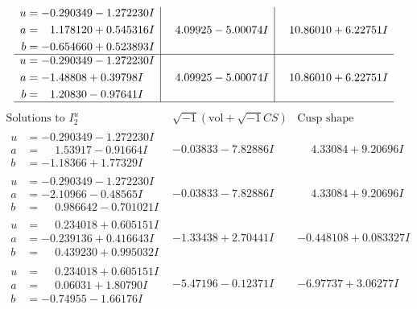 \documentclass[1p]{elsarticle_modified}
\theoremstyle{definition}
\newcommand{\I}{\sqrt{-1}}
\begin{document}
$$\begin{array}{c|c|c}
\begin{aligned}
u &= -0.290349 - 1.272230 I \\
a &= \phantom{-}1.178120 + 0.545316 I \\
b &= -0.654660 + 0.523893 I\end{aligned}
 & \phantom{-}4.09925 - 5.00074 I & \phantom{-}10.86010 + 6.22751 I \\ \hline\begin{aligned}
u &= -0.290349 - 1.272230 I \\
a &= -1.48808 + 0.39798 I \\
b &= \phantom{-}1.20830 - 0.97641 I\end{aligned}
 & \phantom{-}4.09925 - 5.00074 I & \phantom{-}10.86010 + 6.22751 I\\
 \hline 
 \end{array}$$\newpage$$\begin{array}{c|c|c}  
\text{Solutions to }I^u_{2}& \I (\text{vol} + \sqrt{-1}CS) & \text{Cusp shape}\\
 \hline 
\begin{aligned}
u &= -0.290349 - 1.272230 I \\
a &= \phantom{-}1.53917 - 0.91664 I \\
b &= -1.18366 + 1.77329 I\end{aligned}
 & -0.03833 - 7.82886 I & \phantom{-}4.33084 + 9.20696 I \\ \hline\begin{aligned}
u &= -0.290349 - 1.272230 I \\
a &= -2.10966 - 0.48565 I \\
b &= \phantom{-}0.986642 - 0.701021 I\end{aligned}
 & -0.03833 - 7.82886 I & \phantom{-}4.33084 + 9.20696 I \\ \hline\begin{aligned}
u &= \phantom{-}0.234018 + 0.605151 I \\
a &= -0.239136 + 0.416643 I \\
b &= \phantom{-}0.439230 + 0.995032 I\end{aligned}
 & -1.33438 + 2.70441 I & -0.448108 + 0.083327 I \\ \hline\begin{aligned}
u &= \phantom{-}0.234018 + 0.605151 I \\
a &= \phantom{-}0.06031 + 1.80790 I \\
b &= -0.74955 - 1.66176 I\end{aligned}
 & -5.47196 - 0.12371 I & -6.97737 + 3.06277 I \\ \hline\begin{aligned}

\end{aligned}
\end{array}$$
\end{document}
